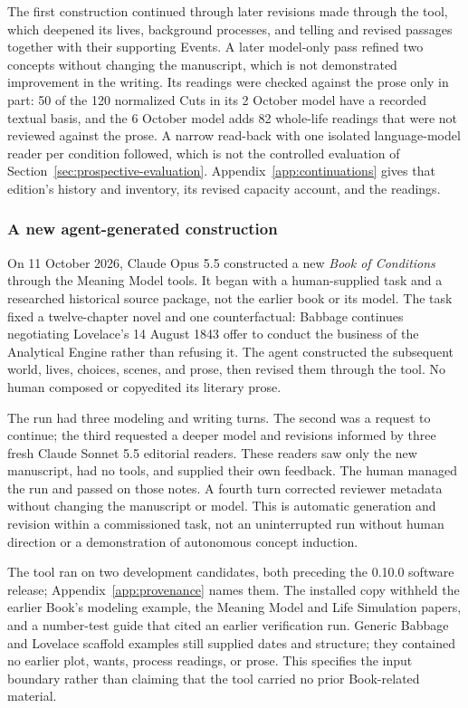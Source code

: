 \documentclass[11pt,a4paper]{article}
\begin{document}
The first construction continued through later revisions made through the tool,
which deepened its lives, background processes, and telling and revised passages
together with their supporting Events. A later model-only pass refined two
concepts without changing the manuscript, which is not demonstrated improvement
in the writing. Its readings were checked against the prose only in part: 50 of
the 120 normalized Cuts in its 2 October model have a recorded textual basis,
and the 6 October model adds 82 whole-life readings that were not reviewed
against the prose. A narrow read-back with one isolated language-model reader
per condition followed, which is not the controlled evaluation of
Section~\ref{sec:prospective-evaluation}. Appendix~\ref{app:continuations} gives
that edition's history and inventory, its revised capacity account, and the
readings.

\subsubsection{A new agent-generated construction}
\label{sec:book-rerun}

On 11 October 2026, Claude Opus 5.5 constructed a new \emph{Book of Conditions}
through the Meaning Model tools. It began with a human-supplied task and a
researched historical source package, not the earlier book or its model. The
task fixed a twelve-chapter novel and one counterfactual: Babbage continues
negotiating Lovelace's 14 August 1843 offer to conduct the business
of the Analytical Engine rather than refusing it. The agent constructed the
subsequent world, lives, choices, scenes, and prose, then revised them
through the tool. No human composed or copyedited its literary prose.

The run had three modeling and writing turns. The second was a request to
continue; the third requested a deeper model and revisions informed by three
fresh Claude Sonnet 5.5 editorial readers. These readers saw only the new
manuscript, had no tools, and supplied their own feedback. The human managed
the run and passed on those notes. A fourth turn corrected reviewer metadata
without changing the manuscript or model. This is automatic generation and
revision within a commissioned task, not an uninterrupted run without human
direction or a demonstration of autonomous concept induction.

The tool ran on two development candidates, both preceding the 0.10.0 software
release; Appendix~\ref{app:provenance} names them. The installed copy withheld
the earlier Book's modeling example, the Meaning Model and Life Simulation
papers, and a number-test guide that cited an earlier verification run. Generic
Babbage and Lovelace scaffold examples still supplied dates and structure; they
contained no earlier plot, wants, process readings, or prose. This specifies the
input boundary rather than claiming that the tool carried no prior Book-related
material.
\end{document}
